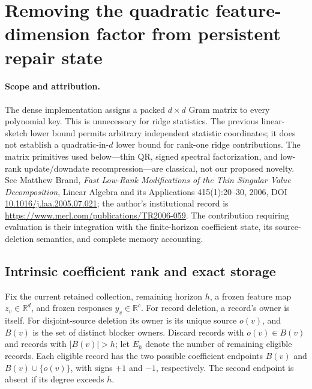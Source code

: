 \section{Removing the quadratic feature-dimension factor from persistent repair state}
\label{sec:memory-factor-addendum}

\paragraph{Scope and attribution.}
The dense implementation assigns a packed $d\times d$ Gram matrix to every
polynomial key. This is unnecessary for ridge statistics. The previous
linear-sketch lower bound permits arbitrary independent statistic coordinates;
it does not establish a quadratic-in-$d$ lower bound for rank-one ridge
contributions. The matrix primitives used below---thin QR, signed spectral
factorization, and low-rank update/downdate recompression---are classical, not
our proposed novelty. See Matthew Brand, \emph{Fast Low-Rank Modifications of
the Thin Singular Value Decomposition}, Linear Algebra and its Applications
415(1):20--30, 2006, DOI \href{https://doi.org/10.1016/j.laa.2005.07.021}{10.1016/j.laa.2005.07.021};
the author's institutional record is
\url{https://www.merl.com/publications/TR2006-059}.
The contribution requiring evaluation is their integration with the
finite-horizon coefficient state, its source-deletion semantics, and complete
memory accounting.

\subsection{Intrinsic coefficient rank and exact storage}
Fix the current retained collection, remaining horizon $h$, a frozen feature
map $z_v\in\mathbb R^d$, and frozen responses $y_v\in\mathbb R^c$. For record
deletion, a record's owner is itself. For disjoint-source deletion its owner
is its unique source $o(v)$, and $B(v)$ is the set of distinct blocker owners.
Discard records with $o(v)\in B(v)$ and records with $|B(v)|>h$; let $E_h$
denote the number of remaining eligible records. Each eligible record has
the two possible coefficient endpoints $B(v)$ and $B(v)\cup\{o(v)\}$, with
signs $+1$ and $-1$, respectively. The second endpoint is absent if its
degree exceeds $h$.

